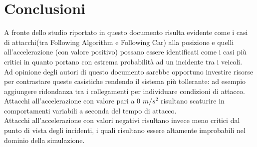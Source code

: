 \section{Conclusioni}
A fronte dello studio riportato in questo documento risulta evidente come i casi di attacchi(tra Following Algorithm e Following Car) alla posizione e quelli all'accelerazione (con valore positivo) possano essere identificati come i casi più critici in quanto portano con estrema probabilità ad un incidente tra i veicoli. \\
Ad opinione degli autori di questo documento sarebbe opportuno investire risorse per contrastare queste casistiche rendendo il sistema più tollerante: ad esempio aggiungere ridondanza tra i collegamenti per individuare condizioni di attacco. \\
Attacchi all'accelerazione con valore pari a 0 $m/s^2$ risultano scaturire in comportamenti variabili a seconda del tempo di attacco.\\
Attacchi all'accelerazione con valori negativi risultano invece meno critici dal punto di vista degli incidenti, i quali risultano essere altamente improbabili nel dominio della simulazione.